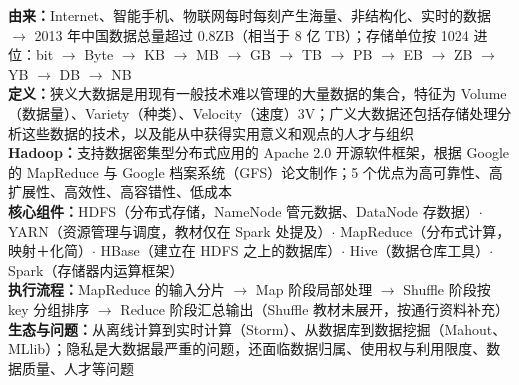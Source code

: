 \documentclass[a4paper,11pt]{article}
\begin{document}

\begin{knowmap}
\textbf{由来：}Internet、智能手机、物联网每时每刻产生海量、非结构化、实时的数据 $\rightarrow$ 2013 年中国数据总量超过 0.8ZB（相当于 8 亿 TB）；存储单位按 1024 进位：bit $\rightarrow$ Byte $\rightarrow$ KB $\rightarrow$ MB $\rightarrow$ GB $\rightarrow$ TB $\rightarrow$ PB $\rightarrow$ EB $\rightarrow$ ZB $\rightarrow$ YB $\rightarrow$ DB $\rightarrow$ NB\\[2pt]
\textbf{定义：}狭义大数据是用现有一般技术难以管理的大量数据的集合，特征为 Volume（数据量）、Variety（种类）、Velocity（速度）3V；广义大数据还包括存储处理分析这些数据的技术，以及能从中获得实用意义和观点的人才与组织\\[2pt]
\textbf{Hadoop：}支持数据密集型分布式应用的 Apache 2.0 开源软件框架，根据 Google 的 MapReduce 与 Google 档案系统（GFS）论文制作；5 个优点为高可靠性、高扩展性、高效性、高容错性、低成本\\[2pt]
\textbf{核心组件：}HDFS（分布式存储，NameNode 管元数据、DataNode 存数据）$\cdot$ YARN（资源管理与调度，教材仅在 Spark 处提及）$\cdot$ MapReduce（分布式计算，映射＋化简）$\cdot$ HBase（建立在 HDFS 之上的数据库）$\cdot$ Hive（数据仓库工具）$\cdot$ Spark（存储器内运算框架）\\[2pt]
\textbf{执行流程：}MapReduce 的输入分片 $\rightarrow$ Map 阶段局部处理 $\rightarrow$ Shuffle 阶段按 key 分组排序 $\rightarrow$ Reduce 阶段汇总输出（Shuffle 教材未展开，按通行资料补充）\\[2pt]
\textbf{生态与问题：}从离线计算到实时计算（Storm）、从数据库到数据挖掘（Mahout、MLlib）；隐私是大数据最严重的问题，还面临数据归属、使用权与利用限度、数据质量、人才等问题
\end{knowmap}
\end{document}

